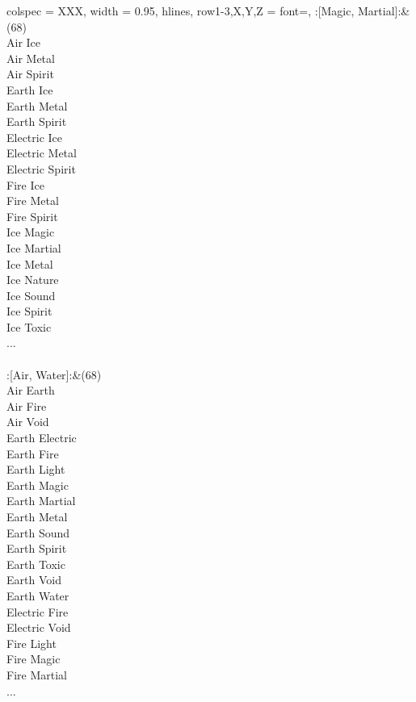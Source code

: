 \begin{longtblr}[
	caption = {2v2 Attacking Effective},
	label = {2v2-Attacking-Effective},
]{
	colspec = {XXX}, width = 0.95\linewidth,
	hlines,
	row{1-3,X,Y,Z} = {font=\bfseries},
}
	:[Magic, Martial]:&{(68)\\
	Air Ice \\
	Air Metal \\
	Air Spirit \\
	Earth Ice \\
	Earth Metal \\
	Earth Spirit \\
	Electric Ice \\
	Electric Metal \\
	Electric Spirit \\
	Fire Ice \\
	Fire Metal \\
	Fire Spirit \\
	Ice Magic \\
	Ice Martial \\
	Ice Metal \\
	Ice Nature \\
	Ice Sound \\
	Ice Spirit \\
	Ice Toxic \\
	...\\
	}\\

	:[Air, Water]:&{(68)\\
	Air Earth \\
	Air Fire \\
	Air Void \\
	Earth Electric \\
	Earth Fire \\
	Earth Light \\
	Earth Magic \\
	Earth Martial \\
	Earth Metal \\
	Earth Sound \\
	Earth Spirit \\
	Earth Toxic \\
	Earth Void \\
	Earth Water \\
	Electric Fire \\
	Electric Void \\
	Fire Light \\
	Fire Magic \\
	Fire Martial \\
	...\\
	}\\


\end{longtblr}
